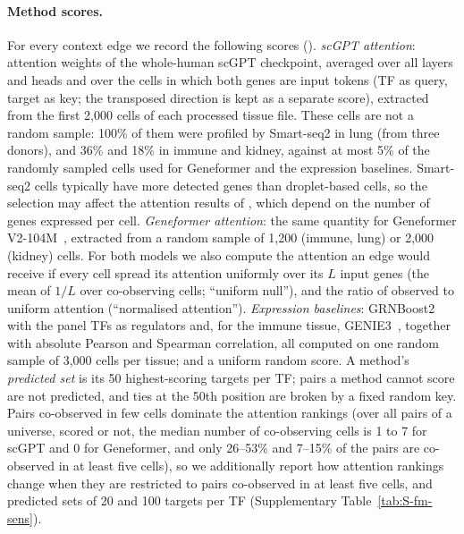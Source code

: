 \documentclass[11pt,a4paper]{article}
\begin{document}
\paragraph{Method scores.}
For every context edge we record the following scores ().
\emph{scGPT attention}: attention weights of the whole-human scGPT checkpoint, averaged over all layers and heads and over the cells in which both genes are input tokens (TF as query, target as key; the transposed direction is kept as a separate score), extracted from the first 2{,}000 cells of each processed tissue file. These cells are not a random sample: 100\% of them were profiled by Smart-seq2 in lung (from three donors), and 36\% and 18\% in immune and kidney, against at most 5\% of the randomly sampled cells used for Geneformer and the expression baselines. Smart-seq2 cells typically have more detected genes than droplet-based cells, so the selection may affect the attention results of , which depend on the number of genes expressed per cell.
\emph{Geneformer attention}: the same quantity for Geneformer V2-104M~\citep{chen2026geneformer}, extracted from a random sample of 1{,}200 (immune, lung) or 2{,}000 (kidney) cells.
For both models we also compute the attention an edge would receive if every cell spread its attention uniformly over its $L$ input genes (the mean of $1/L$ over co-observing cells; ``uniform null''), and the ratio of observed to uniform attention (``normalised attention'').
\emph{Expression baselines}: GRNBoost2~\citep{moerman2019grnboost2} with the panel TFs as regulators and, for the immune tissue, GENIE3~\citep{huynh2010inferring}, together with absolute Pearson and Spearman correlation, all computed on one random sample of 3{,}000 cells per tissue; and a uniform random score.
A method's \emph{predicted set} is its 50 highest-scoring targets per TF; pairs a method cannot score are not predicted, and ties at the 50{}th position are broken by a fixed random key.
Pairs co-observed in few cells dominate the attention rankings (over all pairs of a universe, scored or not, the median number of co-observing cells is 1 to 7 for scGPT and 0 for Geneformer, and only 26--53\% and 7--15\% of the pairs are co-observed in at least five cells), so we additionally report how attention rankings change when they are restricted to pairs co-observed in at least five cells, and predicted sets of 20 and 100 targets per TF (Supplementary Table~\ref{tab:S-fm-sens}).
\end{document}
